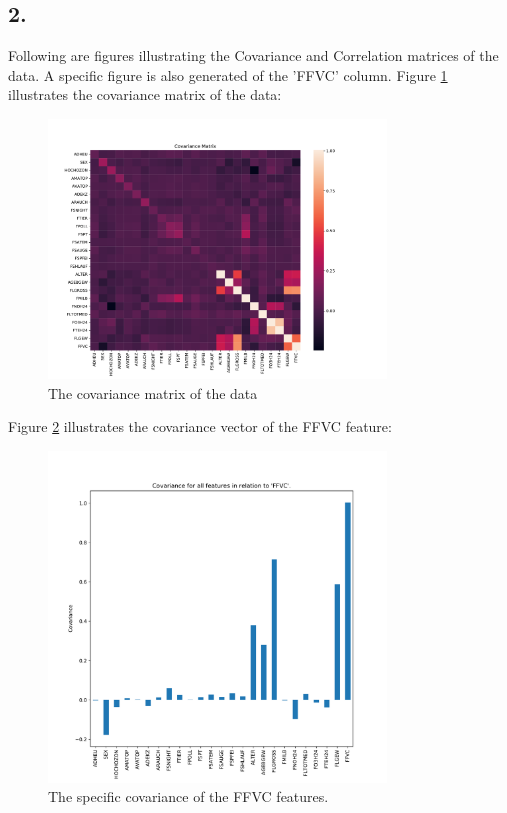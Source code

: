 \documentclass[]{article}
\begin{document}
\subsection*{2.}
Following are figures illustrating the Covariance and Correlation matrices of the data. A specific figure is also generated of the 'FFVC' column. Figure \ref{fig:covE1} illustrates the covariance matrix of the data:
\begin{figure}[H]
	\centering
	\includegraphics[width=0.8\textwidth]{figures/covheatmap.pdf}
	\caption{The covariance matrix of the data}
	\label{fig:covE1}
\end{figure}
Figure \ref{fig:cov_FFVC_E1} illustrates the covariance vector of the FFVC feature:
\begin{figure}[H]
	\centering
	\includegraphics[width=0.8\textwidth]{figures/cov_FFVC_specific.pdf}
	\caption{The specific covariance of the FFVC features.}
	\label{fig:cov_FFVC_E1}
\end{figure}
\end{document}
